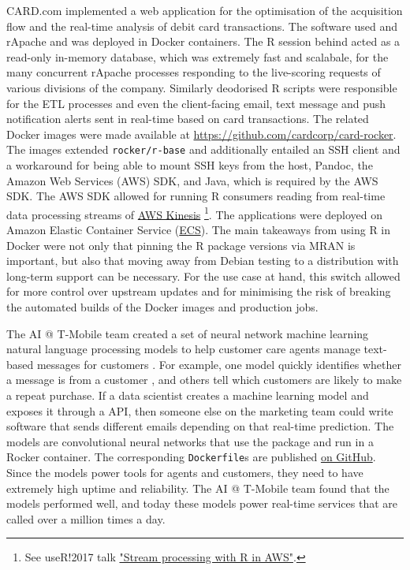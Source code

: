 CARD.com implemented a web application for the optimisation of the
acquisition flow and the real-time analysis of debit card transactions.
The software used  and rApache and was deployed in
Docker containers. The R session behind  acted as a
read-only in-memory database, which was extremely fast and scalabale,
for the many concurrent rApache processes responding to the live-scoring
requests of various divisions of the company. Similarly deodorised R
scripts were responsible for the ETL processes and even the
client-facing email, text message and push notification alerts sent in
real-time based on card transactions. The related Docker images were
made available at \url{https://github.com/cardcorp/card-rocker}. The
images extended \texttt{rocker/r-base} and additionally entailed an SSH
client and a workaround for being able to mount SSH keys from the host,
Pandoc, the Amazon Web Services (AWS) SDK, and Java, which is required
by the AWS SDK. The AWS SDK allowed for running R consumers reading from
real-time data processing streams of
\href{https://aws.amazon.com/kinesis/}{AWS Kinesis}
\footnote{See useR!2017 talk \href{https://static.sched.com/hosted\_files/user2017/2f/AWR Kinesis at useR 2017.pdf}{"Stream processing with R in AWS"}.}.
The applications were deployed on Amazon Elastic Container Service
(\href{https://aws.amazon.com/ecs/}{ECS}). The main takeaways from using
R in Docker were not only that pinning the R package versions via MRAN
is important, but also that moving away from Debian testing to a
distribution with long-term support can be necessary. For the use case
at hand, this switch allowed for more control over upstream updates and
for minimising the risk of breaking the automated builds of the Docker
images and production jobs.

The AI @ T-Mobile team created a set of neural network machine learning
natural language processing models to help customer care agents manage
text-based messages for customers \citep{t-mobile_enterprise_2018}. For
example, one model quickly identifies whether a message is from a
customer
\citep[see -based \href{https://secure.message.t-mobile.com/v1/shiny/is-customer/app/}{demo} further described by ][]{nolis_small_2019},
and others tell which customers are likely to make a repeat purchase. If
a data scientist creates a machine learning model and exposes it through
a  API, then someone else on the marketing team could
write software that sends different emails depending on that real-time
prediction. The models are convolutional neural networks that use the
 package \citep{cran_keras} and run in a Rocker
container. The corresponding \texttt{Dockerfile}s are published
\href{https://github.com/tmobile/r-tensorflow-api}{on GitHub}. Since the
models power tools for agents and customers, they need to have extremely
high uptime and reliability. The AI @ T-Mobile team found that the
models performed well, and today these models power real-time services
that are called over a million times a day.

